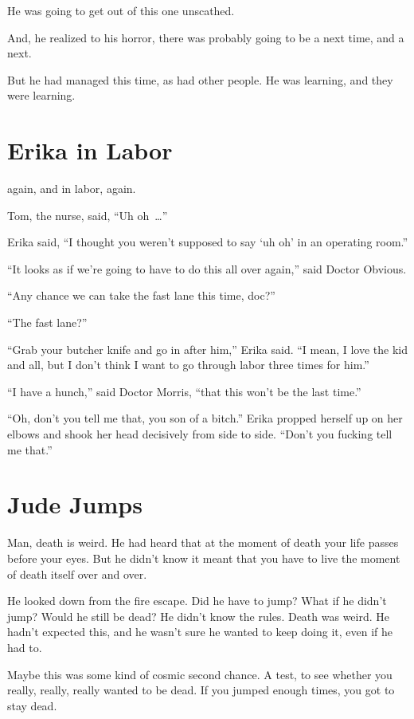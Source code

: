 He was going to get out of this one unscathed.

And, he realized to his horror, there was probably going to be a next time, and a next.

But he had managed this time, as had other people. He was learning, and they were learning.



\chapter{Erika in Labor}

 again, and in labor, again.

Tom, the nurse, said, “Uh oh~…”

Erika said, “I thought you weren’t supposed to say ‘uh oh’ in an operating room.”

“It looks as if we’re going to have to do this all over again,” said Doctor Obvious.

“Any chance we can take the fast lane this time, doc?”

“The fast lane?”

“Grab your butcher knife and go in after him,” Erika said. “I mean, I love the kid and all, but I don’t think I want to go through labor three times for him.”

“I have a hunch,” said Doctor Morris, “that this won’t be the last time.”

“Oh, don’t you tell me that, you son of a bitch.” Erika propped herself up on her elbows and shook her head decisively from side to side. “Don’t you fucking tell me that.”



\chapter{Jude Jumps}

 Man, death is weird. He had heard that at the moment of death your life passes before your eyes. But he didn’t know it meant that you have to live the moment of death itself over and over.

He looked down from the fire escape. Did he have to jump? What if he didn’t jump? Would he still be dead? He didn’t know the rules. Death was weird. He hadn’t expected this, and he wasn’t sure he wanted to keep doing it, even if he had to.

Maybe this was some kind of cosmic second chance. A test, to see whether you really, really, really wanted to be dead. If you jumped enough times, you got to stay dead.

